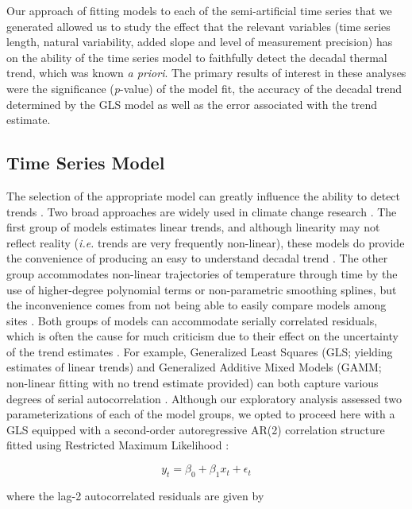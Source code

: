 \documentclass[]{ametsoc}
\begin{document}
Our approach of fitting models to each of the semi-artificial time series that we generated allowed us to study the effect that the relevant variables (time series length, natural variability, added slope and level of measurement precision) has on the ability of the time series model to faithfully detect the decadal thermal trend, which was known \emph{a priori}. The primary results of interest in these analyses were the significance (\emph{p}-value) of the model fit, the accuracy of the decadal trend determined by the GLS model as well as the error associated with the trend estimate.

\subsection{Time Series Model}
The selection of the appropriate model can greatly influence the ability to detect trends \citet{Franzke2012}. Two broad approaches are widely used in climate change research \citep{Stocker2013}. The first group of models estimates linear trends, and although linearity may not reflect reality (\emph{i.e.} trends are very frequently non-linear), these models do provide the convenience of producing an easy to understand decadal trend \citep[\emph{e.g}. \SI{0.106}{\degreeCelsius}~dec$^{-1}$;][]{Wilks2011,Stocker2013}. The other group accommodates non-linear trajectories of temperature through time by the use of higher-degree polynomial terms or non-parametric smoothing splines, but the inconvenience comes from not being able to easily compare models among sites \citep{Scinocca2010,Wood2006}. Both groups of models can accommodate serially correlated residuals, which is often the cause for much criticism due to their effect on the uncertainty of the trend estimates \citep{vonStorch1999,Santer2008}. For example, Generalized Least Squares (GLS; yielding estimates of linear trends) and Generalized Additive Mixed Models (GAMM; non-linear fitting with no trend estimate provided) can both capture various degrees of serial autocorrelation \citep{Wood2006,pinheiro2006mixed}. Although our exploratory analysis assessed two parameterizations of each of the model groups, we opted to proceed here with a GLS equipped with a second-order autoregressive AR(2) correlation structure fitted using Restricted Maximum Likelihood \citep[REML;][]{pinheiro2006mixed}:

$$y_{t} = \beta_{0} + \beta_{1}x_{t} + \epsilon_{t}$$

where the lag-2 autocorrelated residuals are given by
\end{document}
